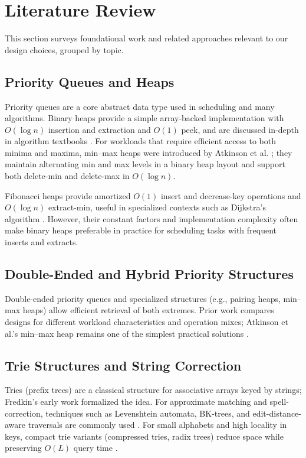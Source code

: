 \documentclass[conference,10pt]{IEEEtran}
\begin{document}
\section{Literature Review}
This section surveys foundational work and related approaches relevant to our design choices, grouped by topic.

\subsection{Priority Queues and Heaps}
Priority queues are a core abstract data type used in scheduling and many algorithms. Binary heaps provide a simple array-backed implementation with \(O(\log n)\) insertion and extraction and \(O(1)\) peek, and are discussed in-depth in algorithm textbooks \cite{cormen2009introduction}. For workloads that require efficient access to both minima and maxima, min--max heaps were introduced by Atkinson et al. \cite{atkinson1986minmax}; they maintain alternating min and max levels in a binary heap layout and support both delete-min and delete-max in \(O(\log n)\).

Fibonacci heaps provide amortized \(O(1)\) insert and decrease-key operations and \(O(\log n)\) extract-min, useful in specialized contexts such as Dijkstra's algorithm \cite{fredman1987fibonacci}. However, their constant factors and implementation complexity often make binary heaps preferable in practice for scheduling tasks with frequent inserts and extracts.

\subsection{Double-Ended and Hybrid Priority Structures}
Double-ended priority queues and specialized structures (e.g., pairing heaps, min--max heaps) allow efficient retrieval of both extremes. Prior work compares designs for different workload characteristics and operation mixes; Atkinson et al.'s min--max heap remains one of the simplest practical solutions \cite{atkinson1986minmax}.

\subsection{Trie Structures and String Correction}
Tries (prefix trees) are a classical structure for associative arrays keyed by strings; Fredkin's early work \cite{fredkin1960trie} formalized the idea. For approximate matching and spell-correction, techniques such as Levenshtein automata, BK-trees, and edit-distance-aware traversals are commonly used \cite{navarro2001approximate, gusfield1997algorithms}. For small alphabets and high locality in keys, compact trie variants (compressed tries, radix trees) reduce space while preserving \(O(L)\) query time \cite{fredkin1960trie, gusfield1997algorithms}.
\end{document}
